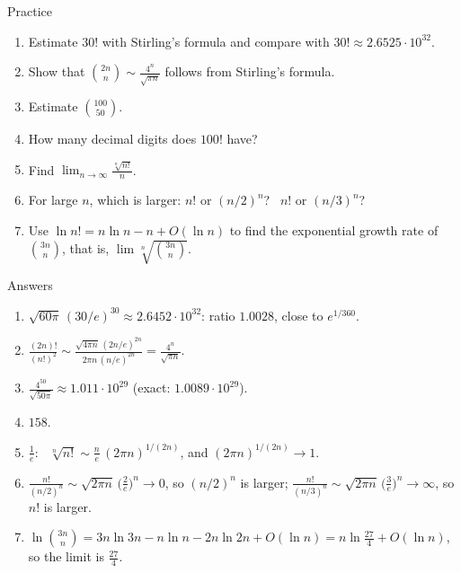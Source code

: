 \documentclass[10pt]{wosm-slides}
\begin{document}
\begin{frame}{Practice}
  \small
  \begin{enumerate}
    \item Estimate $30!$ with Stirling's formula and compare with $30! \approx 2.6525 \cdot 10^{32}$.
    \item Show that $\binom{2n}{n} \sim \frac{4^n}{\sqrt{\pi n}}$ follows from Stirling's formula.
    \item Estimate $\binom{100}{50}$.
    \item How many decimal digits does $100!$ have?
    \item Find $\displaystyle\lim_{n\to\infty} \frac{\sqrt[n]{n!}}{n}$.
    \item For large $n$, which is larger: $n!$ or $(n/2)^n$? \ $n!$ or $(n/3)^n$?
    \item Use $\ln n! = n \ln n - n + O(\ln n)$ to find the exponential growth rate of
      $\binom{3n}{n}$, that is, $\lim \sqrt[n]{\binom{3n}{n}}$.
  \end{enumerate}
\end{frame}

\begin{frame}{Answers}
  \small
  \begin{enumerate}
    \item $\sqrt{60\pi}\,(30/e)^{30} \approx 2.6452 \cdot 10^{32}$: ratio $1.0028$, close to
      $e^{1/360}$.
    \item $\frac{(2n)!}{(n!)^2} \sim \frac{\sqrt{4\pi n}\,(2n/e)^{2n}}{2\pi n\,(n/e)^{2n}}
      = \frac{4^n}{\sqrt{\pi n}}$.
    \item $\frac{4^{50}}{\sqrt{50\pi}} \approx 1.011 \cdot 10^{29}$ (exact: $1.0089 \cdot 10^{29}$).
    \item $158$.
    \item $\frac1e$: \ $\sqrt[n]{n!} \sim \frac{n}{e}\,(2\pi n)^{1/(2n)}$, and
      $(2\pi n)^{1/(2n)} \to 1$.
    \item $\frac{n!}{(n/2)^n} \sim \sqrt{2\pi n}\,\bigl(\frac2e\bigr)^n \to 0$, so $(n/2)^n$ is larger;
      $\frac{n!}{(n/3)^n} \sim \sqrt{2\pi n}\,\bigl(\frac3e\bigr)^n \to \infty$, so $n!$ is larger.
    \item $\ln\binom{3n}{n} = 3n\ln 3n - n \ln n - 2n \ln 2n + O(\ln n)
      = n \ln\frac{27}{4} + O(\ln n)$, so the limit is $\frac{27}{4}$.
  \end{enumerate}
\end{frame}
\end{document}
